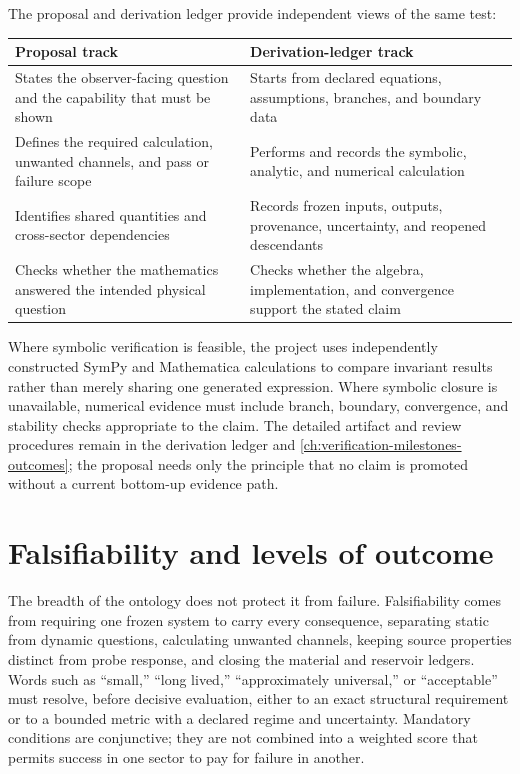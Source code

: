 The proposal and derivation ledger provide independent views of the same test:

\begin{center}
\begin{tabularx}{\textwidth}{@{}YY@{}}
\toprule
\textbf{Proposal track} & \textbf{Derivation-ledger track} \\
\midrule
States the observer-facing question and the capability that must be shown
& Starts from declared equations, assumptions, branches, and boundary data \\
Defines the required calculation, unwanted channels, and pass or failure scope
& Performs and records the symbolic, analytic, and numerical calculation \\
Identifies shared quantities and cross-sector dependencies
& Records frozen inputs, outputs, provenance, uncertainty, and reopened descendants \\
Checks whether the mathematics answered the intended physical question
& Checks whether the algebra, implementation, and convergence support the stated claim \\
\bottomrule
\end{tabularx}
\end{center}

Where symbolic verification is feasible, the project uses independently
constructed SymPy and Mathematica calculations to compare invariant results
rather than merely sharing one generated expression. Where symbolic closure is
unavailable, numerical evidence must include branch, boundary, convergence, and
stability checks appropriate to the claim. The detailed artifact and review
procedures remain in the derivation ledger and \cref{ch:verification-milestones-outcomes};
the proposal needs only the principle that no claim is promoted without a
current bottom-up evidence path.

\section{Falsifiability and levels of outcome}

The breadth of the ontology does not protect it from failure. Falsifiability
comes from requiring one frozen system to carry every consequence, separating
static from dynamic questions, calculating unwanted channels, keeping source
properties distinct from probe response, and closing the material and reservoir
ledgers. Words such as ``small,'' ``long lived,'' ``approximately universal,''
or ``acceptable'' must resolve, before decisive evaluation, either to an exact
structural requirement or to a bounded metric with a declared regime and
uncertainty. Mandatory conditions are conjunctive; they are not combined into a
weighted score that permits success in one sector to pay for failure in another.

